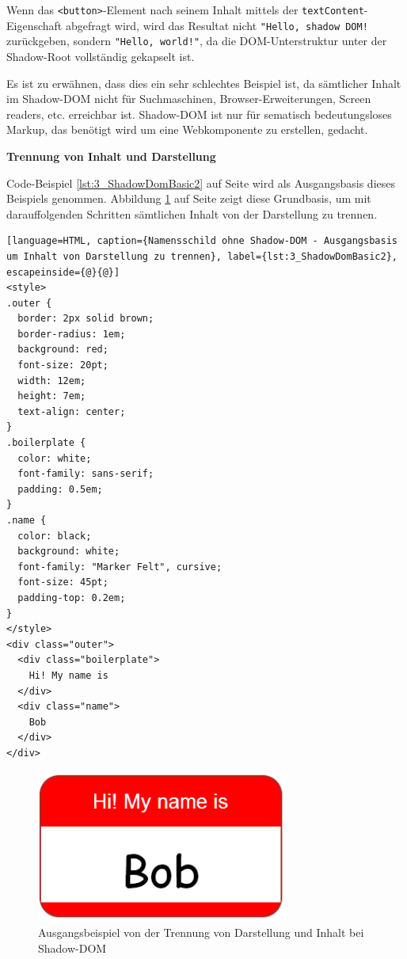 Wenn das \lstinline|<button>|-Element nach seinem Inhalt mittels der \lstinline|textContent|-Eigenschaft abgefragt wird, wird das Resultat nicht \lstinline|"Hello, shadow DOM!| zurückgeben, sondern \lstinline|"Hello, world!"|, da die DOM-Unterstruktur unter der Shadow-Root vollständig gekapselt ist.

Es ist zu erwähnen, dass dies ein sehr schlechtes Beispiel ist, da sämtlicher Inhalt im Shadow-DOM nicht für Suchmaschinen, Browser-Erweiterungen, Screen readers, etc. erreichbar ist. Shadow-DOM ist nur für sematisch bedeutungsloses Markup, das benötigt wird um eine Webkomponente zu erstellen, gedacht.

\textbf{Trennung von Inhalt und Darstellung}

Code-Beispiel \ref{lst:3_ShadowDomBasic2} auf Seite \pageref{lst:3_ShadowDomBasic2} wird als Ausgangsbasis dieses Beispiels genommen. Abbildung \ref{fig:3_ShadowDom2} auf Seite \pageref{fig:3_ShadowDom2} zeigt diese Grundbasis, um mit darauffolgenden Schritten sämtlichen Inhalt von der Darstellung zu trennen.

\begin{lstlisting}[language=HTML, caption={Namensschild ohne Shadow-DOM - Ausgangsbasis um Inhalt von Darstellung zu trennen}, label={lst:3_ShadowDomBasic2}, escapeinside={@}{@}]
<style>
.outer {
  border: 2px solid brown;
  border-radius: 1em;
  background: red;
  font-size: 20pt;
  width: 12em;
  height: 7em;
  text-align: center;
}
.boilerplate {
  color: white;
  font-family: sans-serif;
  padding: 0.5em;
}
.name {
  color: black;
  background: white;
  font-family: "Marker Felt", cursive;
  font-size: 45pt;
  padding-top: 0.2em;
}
</style>
<div class="outer">
  <div class="boilerplate">
    Hi! My name is
  </div>
  <div class="name">
    Bob
  </div>
</div>
\end{lstlisting}

\begin{figure}[h]
\centering
\includegraphics[height=5.0cm]{images/SS3.png}
\caption[
  Ausgangsbeispiel von der Trennung von Darstellung und Inhalt bei Shadow-DOM
]{Ausgangsbeispiel von der Trennung von Darstellung und Inhalt bei Shadow-DOM}
\label{fig:3_ShadowDom2}
\end{figure}

